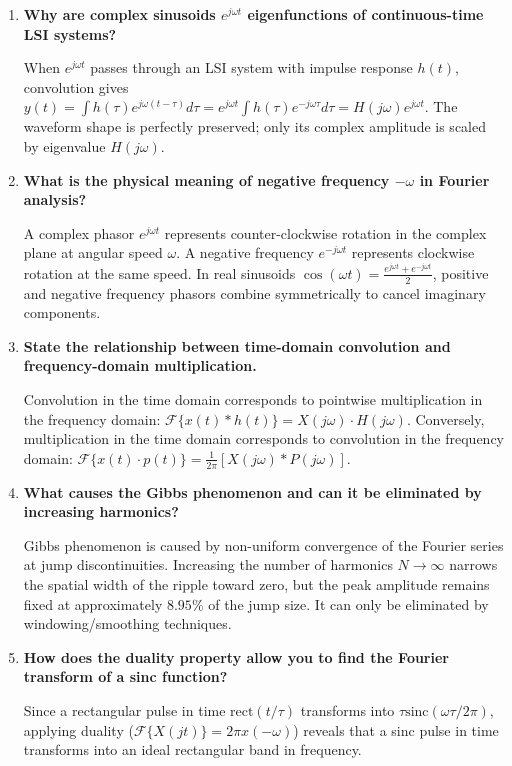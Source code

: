 \documentclass[12pt,a4paper]{article}
\newcommand{\Q}[1]{\textbf{#1}\par\noindent\ignorespaces}
\begin{document}
\begin{tcolorbox}[exambox, title={\textbf{Frequently Asked / Viva Questions}}]
\begin{enumerate}[topsep=0pt, label=\textbf{Q\arabic*.}, itemsep=5pt]
  \item \Q{Why are complex sinusoids $e^{j\omega t}$ eigenfunctions of continuous-time LSI systems?}
  When $e^{j\omega t}$ passes through an LSI system with impulse response $h(t)$, convolution gives $y(t) = \int h(\tau) e^{j\omega(t-\tau)} d\tau = e^{j\omega t} \int h(\tau) e^{-j\omega\tau} d\tau = H(j\omega) e^{j\omega t}$. The waveform shape is perfectly preserved; only its complex amplitude is scaled by eigenvalue $H(j\omega)$.

  \item \Q{What is the physical meaning of negative frequency $-\omega$ in Fourier analysis?}
  A complex phasor $e^{j\omega t}$ represents counter-clockwise rotation in the complex plane at angular speed $\omega$. A negative frequency $e^{-j\omega t}$ represents clockwise rotation at the same speed. In real sinusoids $\cos(\omega t) = \frac{e^{j\omega t} + e^{-j\omega t}}{2}$, positive and negative frequency phasors combine symmetrically to cancel imaginary components.

  \item \Q{State the relationship between time-domain convolution and frequency-domain multiplication.}
  Convolution in the time domain corresponds to pointwise multiplication in the frequency domain: $\mathcal{F}\{x(t) * h(t)\} = X(j\omega) \cdot H(j\omega)$. Conversely, multiplication in the time domain corresponds to convolution in the frequency domain: $\mathcal{F}\{x(t) \cdot p(t)\} = \frac{1}{2\pi} [X(j\omega) * P(j\omega)]$.

  \item \Q{What causes the Gibbs phenomenon and can it be eliminated by increasing harmonics?}
  Gibbs phenomenon is caused by non-uniform convergence of the Fourier series at jump discontinuities. Increasing the number of harmonics $N \to \infty$ narrows the spatial width of the ripple toward zero, but the peak amplitude remains fixed at approximately $8.95\%$ of the jump size. It can only be eliminated by windowing/smoothing techniques.

  \item \Q{How does the duality property allow you to find the Fourier transform of a sinc function?}
  Since a rectangular pulse in time $\text{rect}(t/\tau)$ transforms into $\tau \text{sinc}(\omega\tau/2\pi)$, applying duality ($\mathcal{F}\{X(jt)\} = 2\pi x(-\omega)$) reveals that a sinc pulse in time transforms into an ideal rectangular band in frequency.


\end{enumerate}
\end{tcolorbox}
\end{document}
